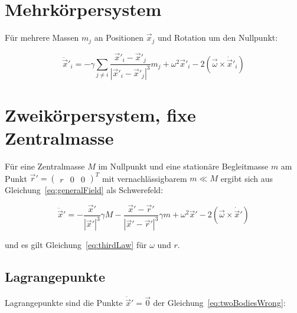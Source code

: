 \documentclass[12pt]{article}
\begin{document}
\section{Mehrkörpersystem}

Für mehrere Massen $m_j$ an Positionen $\vec{x}_j$ und Rotation um den Nullpunkt:

\begin{equation}
\ddot{\vec{x}}'_i = - \gamma \sum_{j \neq i} \frac{\vec{x}'_i-\vec{x}'_j}{\left| \vec{x}'_i-\vec{x}'_j \right|^3} m_j + \omega^2\vec{x}'_i - 2 \left( \vec{\omega} \times \dot{\vec{x}}'_i\right) \label{eq:generalField}
\end{equation}

\section{Zweikörpersystem, fixe Zentralmasse}

Für eine Zentralmasse $M$ im Nullpunkt und eine stationäre Begleitmasse $m$ am Punkt $\vec{r}' = \left( \begin{matrix} r & 0 & 0 \end{matrix} \right)^T$ mit vernachlässigbarem $m \ll M$ ergibt sich aus Gleichung~\ref{eq:generalField} als Schwerefeld:

\begin{equation}
\ddot{\vec{x}}' = - \frac{\vec{x}'}{\left| \vec{x}' \right|^3} \gamma M - \frac{\vec{x}'-\vec{r}'}{\left| \vec{x}' - \vec{r}' \right|^3} \gamma m + \omega^2\vec{x}' - 2 \left( \vec{\omega} \times \dot{\vec{x}}'\right)
\label{eq:twoBodiesWrong}
\end{equation}

\noindent und es gilt Gleichung~\ref{eq:thirdLaw} für $\omega$ und $r$.

\subsection{Lagrangepunkte}

Lagrangepunkte sind die Punkte $\ddot{\vec{x}}' = \vec{0}$ der Gleichung~\ref{eq:twoBodiesWrong}:
\end{document}
